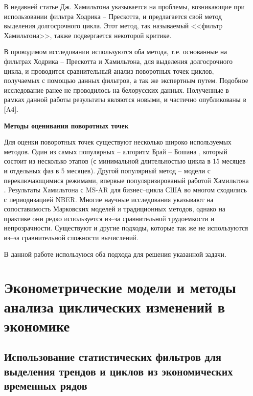 \documentclass[a4paper,14pt]{extreport}
\begin{document}
	В недавней статье Дж. Хамильтона \cite{hamHP} указывается на проблемы, возникающие при использовании фильтра Ходрика -- Прескотта, и предлагается свой метод выделения долгосрочного цикла. Этот метод, так называемый <<фильтр Хамильтона>>, также подвергается некоторой критике.
	
	В проводимом исследовании используются оба метода, т.е. основанные на фильтрах Ходрика -- Прескотта и Хамильтона, для выделения долгосрочного цикла, и проводится сравнительный анализ поворотных точек циклов, получаемых с помощью данных фильтров, а так же экспертным путем. Подобное исследование ранее не проводилось на белорусских данных. Полученные в рамках данной работы результаты являются новыми, и частично опубликованы в [A4].
	
	\bigskip
	\textbf{Методы оценивания поворотных точек}
	
	Для оценки поворотных точек существуют несколько широко используемых методов. Один из самых популярных -- алгоритм Брай -- Бошана \cite{bryCyclicalAnalysis}, который состоит из несколько этапов (с минимальной длительностью цикла в 15 месяцев и отдельных фаз в 5 месяцев). Другой популярный метод -- модели с переключающимися режимами, впервые популяризированый работой Хамильтона \cite{hamNewApproach}. Результаты Хамильтона с MS-AR для бизнес--цикла США во многом сходились с периодизацией NBER. Многие научные исследования \cite{bodmanCanada,brunoItaly,hardingTwoMethods} указывают на сопоставимость Марковских моделей и традиционных методов, однако на практике они редко используется из--за сравнительной трудоемкости и непрозрачности. Существуют и другие подходы, которые так же не используются из--за сравнительной сложности вычислений.
	
	В данной работе используюся оба подхода для решения указанной задачи.
	
	
	
	\chapter{Эконометрические модели и методы анализа циклических изменений в экономике}
	
	
	\section{Использование статистических фильтров для выделения трендов и циклов из экономических временных рядов}
	
\end{document}
